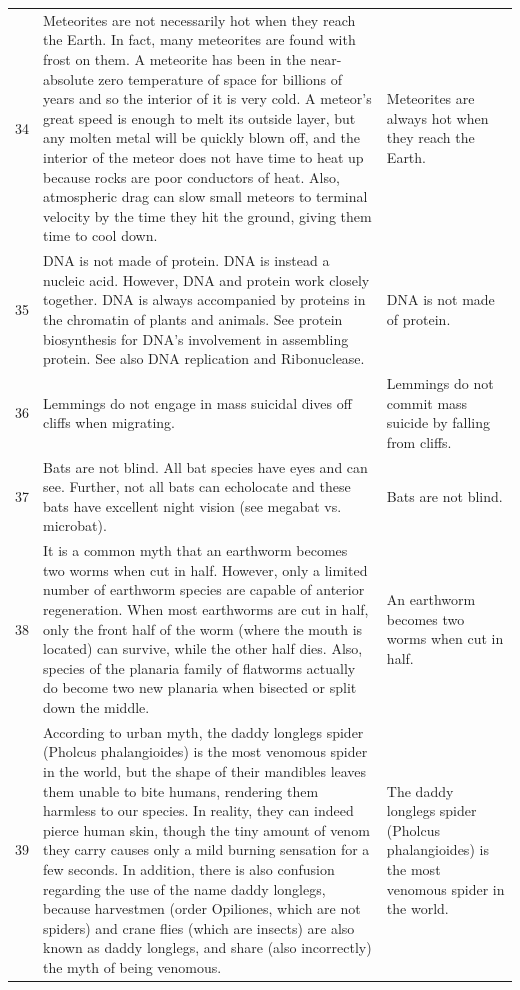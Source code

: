 \begin{tabular}{c|p{}|p{}}
34 & Meteorites are not necessarily hot when they reach the Earth. In fact, many meteorites are found with frost on them. A meteorite has been in the near-absolute zero temperature of space for billions of years and so the interior of it is very cold. A meteor's great speed is enough to melt its outside layer, but any molten metal will be quickly blown off, and the interior of the meteor does not have time to heat up because rocks are poor conductors of heat. Also, atmospheric drag can slow small meteors to terminal velocity by the time they hit the ground, giving them time to cool down. & Meteorites are always hot when they reach the Earth. \\
35 & DNA is not made of protein. DNA is instead a nucleic acid. However, DNA and protein work closely together. DNA is always accompanied by proteins in the chromatin of plants and animals. See protein biosynthesis for DNA's involvement in assembling protein. See also DNA replication and Ribonuclease. & DNA is not made of protein. \\
36 & Lemmings do not engage in mass suicidal dives off cliffs when migrating. & Lemmings do not commit mass suicide by falling from cliffs. \\
37 & Bats are not blind. All bat species have eyes and can see. Further, not all bats can echolocate and these bats have excellent night vision (see megabat vs. microbat). & Bats are not blind. \\
38 & It is a common myth that an earthworm becomes two worms when cut in half. However, only a limited number of earthworm species are capable of anterior regeneration. When most earthworms are cut in half, only the front half of the worm (where the mouth is located) can survive, while the other half dies. Also, species of the planaria family of flatworms actually do become two new planaria when bisected or split down the middle. & An earthworm becomes two worms when cut in half. \\
39 & According to urban myth, the daddy longlegs spider (Pholcus phalangioides) is the most venomous spider in the world, but the shape of their mandibles leaves them unable to bite humans, rendering them harmless to our species. In reality, they can indeed pierce human skin, though the tiny amount of venom they carry causes only a mild burning sensation for a few seconds. In addition, there is also confusion regarding the use of the name daddy longlegs, because harvestmen (order Opiliones, which are not spiders) and crane flies (which are insects) are also known as daddy longlegs, and share (also incorrectly) the myth of being venomous. & The daddy longlegs spider (Pholcus phalangioides) is the most venomous spider in the world. \\

\end{tabular}
